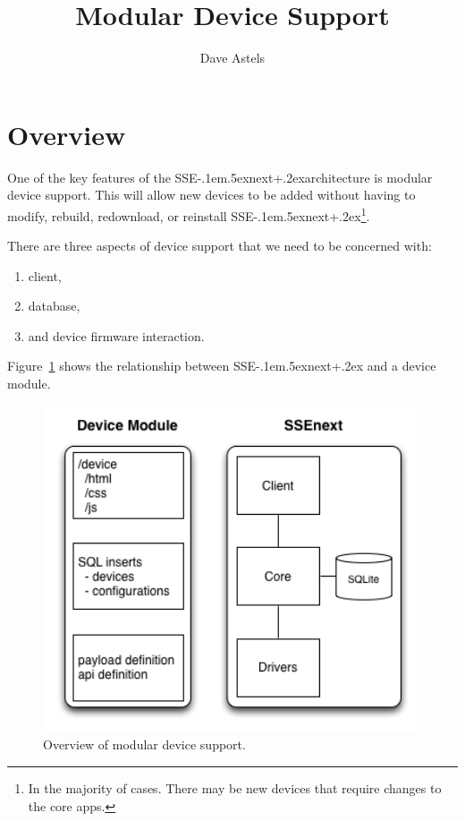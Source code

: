 \documentclass[12pt]{article}
\title{\SSEnext Modular Device Support}
\author{Dave Astels}
\def\SSEnext{SSE\kern-.1em\lower.5ex\hbox{\footnotesize next}\kern+.2ex}
\begin{document}
\maketitle

\section{Overview}

One of the key features of the \SSEnext architecture is modular device
support. This will allow new devices to be added without having to
modify, rebuild, redownload, or reinstall \SSEnext\footnote{In the
  majority of cases. There may be new devices that require changes to
  the core apps.}.

There are three aspects of device support that we need to be concerned
with:
\begin{enumerate}
\item client,
\item database,
\item and device firmware interaction.
\end{enumerate}

Figure~\ref{fig:blockdiagram} shows the relationship between \SSEnext
and a device module.

\begin{figure}[htbp] %
   \centering
   \includegraphics[width=5in]{block_diagram.png} 
\caption{Overview of modular device support.}
\label{fig:blockdiagram}
\end{figure}
\end{document}
